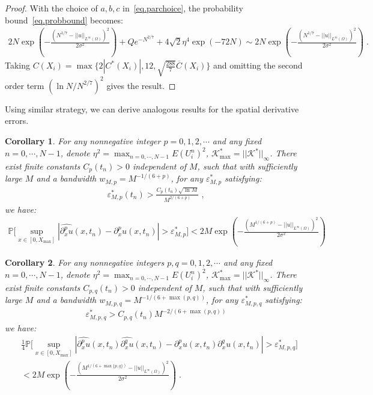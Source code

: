 \documentclass[a4paper,11pt]{article}
\newtheorem{corollary}{Corollary}[section]
\begin{document}
\begin{proof}
With the choice of $a,b,c$ in~\eqref{eq.parchoice}, the probability bound~\eqref{eq.probbound} becomes:
\begin{align*}
2N \exp(-\frac{(N^{1/7}-||u||_{L^\infty(\Omega)})^2}{2\sigma^2})+Qe^{-N^{2/7}}+4\sqrt{2}\eta^4\exp(-72N)\sim 2N \exp(-\frac{(N^{1/7}-||u||_{L^\infty(\Omega)})^2}{2\sigma^2})\;.
\end{align*}
Taking $C(X_i) = \max\{2|C^*(X_i)|,12,\sqrt{\frac{288}{7}}\overline{C}(X_i)\}$	and omitting the second order term $(\ln N/N^{2/7})^2$ gives the result.
\end{proof}
Using similar strategy, we can derive analogous results for the spatial derivative errors.
\begin{corollary}\label{cor.singlespace}
For any nonnegative integer $p=0,1,2,\cdots$ and any fixed $n=0,\cdots,N-1$, denote $\eta^2 = \max_{n=0,\cdots,N-1}E(U_i^n)^2$, $\mathcal{K}^*_{\max}=||\mathcal{K}^*||_\infty$. There exist finite constants $C_{p}(t_n)>0$ independent of $M$, such that with sufficiently large $M$ and a bandwidth $w_{M,p} = M^{-1/(6+p)}$, for any $\varepsilon_{M,p}^*$ satisfying:
\begin{align*}
\varepsilon_{M,p}^*(t_n)> \frac{C_{p}(t_n)\sqrt{\ln M}}{M^{2/(6+p)}}\;,
\end{align*}
we have:
\begin{align}
\mathbb{P}\Big[\sup_{x\in[0,X_{\max}]}|\widehat{\partial_x^pu}(x,t_n)-\partial_x^pu(x,t_n)|>\varepsilon_{M,p}^*\Big]<2M \exp(-\frac{(M^{1/(6+p)}-||u||_{L^\infty(\Omega)})^2}{2\sigma^2})
\end{align}	
\end{corollary}


\begin{corollary}\label{cor.doublespace}
For any nonnegative integers $p,q=0,1,2,\cdots$ and any fixed $n=0,\cdots,N-1$, denote $\eta^2 = \max_{n=0,\cdots,N-1}E(U_i^n)^2$, $\mathcal{K}^*_{\max}=||\mathcal{K}^*||_\infty$. There exist finite constants $C_{p,q}(t_n)>0$ independent of $M$, such that with sufficiently large $M$ and a bandwidth $w_{M,p,q} =M^{-1/(6+\max(p,q))}$,  for any $\varepsilon_{M,p,q}^*$ satisfying:
\begin{align*}
\varepsilon_{M,p,q}^*> C_{p,q}(t_n)M^{-2/(6+\max(p,q))}
\end{align*}
we have:
\begin{align}
&\frac{1}{4}\mathbb{P}\Big[\sup_{x\in[0,X_{\max}]}|\widehat{\partial_x^pu}(x,t_n)\widehat{\partial_x^qu}(x,t_n)-\partial_x^pu(x,t_n)\partial_x^qu(x,t_n)|>\varepsilon_{M,p,q}^*\Big]\nonumber\\
&<2M \exp(-\frac{(M^{1/(6+\max\{p,q\})}-||u||_{L^\infty(\Omega)})^2}{2\sigma^2})\;.
\end{align}	
\end{corollary}
\end{document}
